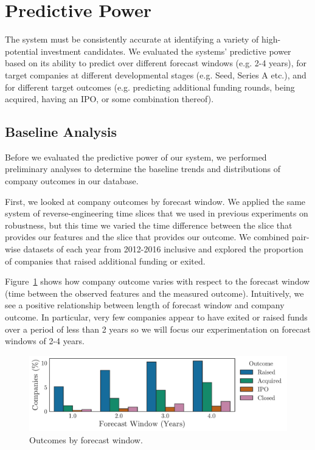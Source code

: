 ﻿\documentclass[../thesis/thesis.tex]{subfiles}
\begin{document}
\section{Predictive Power}

The system must be consistently accurate at identifying a variety of high-potential investment candidates. We evaluated the systems' predictive power based on its ability to predict over different forecast windows (e.g. 2-4 years), for target companies at different developmental stages (e.g. Seed, Series A etc.), and for different target outcomes (e.g. predicting additional funding rounds, being acquired, having an IPO, or some combination thereof).

\subsection{Baseline Analysis}

Before we evaluated the predictive power of our system, we performed preliminary analyses to determine the baseline trends and distributions of company outcomes in our database.

First, we looked at company outcomes by forecast window. We applied the same system of reverse-engineering time slices that we used in previous experiments on robustness, but this time we varied the time difference between the slice that provides our features and the slice that provides our outcome. We combined pair-wise datasets of each year from 2012-2016 inclusive and explored the proportion of companies that raised additional funding or exited.

Figure~\ref{fig:evaluation:outcome_forecast_window} shows how company outcome varies with respect to the forecast window (time between the observed features and the measured outcome). Intuitively, we see a positive relationship between length of forecast window and company outcome. In particular, very few companies appear to have exited or raised funds over a period of less than 2 years so we will focus our experimentation on forecast windows of 2-4 years.

\begin{figure}[!htb]
    \centering
    \includegraphics[width=\textwidth]{../figures/evaluation/outcomes_window}
    \caption[Outcomes by forecast window]{Outcomes by forecast window.}
    \label{fig:evaluation:outcome_forecast_window}
\end{figure}
\end{document}
